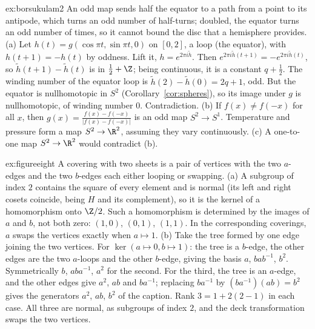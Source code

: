 \begin{solution}{ex:borsukulam2}
\idea An odd map sends half the equator to a path from a point to its antipode, which turns an odd number of half-turns; doubled, the equator turns an odd number of times, so it cannot
bound the disc that a hemisphere provides.
\writeup (a) Let $h(t)=g(\cos\pi t,\sin\pi t,0)$ on $[0,2]$, a loop (the equator), with $h(t+1)=-h(t)$ by oddness. Lift it, $h=e^{2\pi i\tilde h}$. Then $e^{2\pi i\tilde h(t+1)}=-e^{2\pi i\tilde h(t)}$, so
$\tilde h(t+1)-\tilde h(t)$ is in $\frac12+\Z$; being continuous, it is a constant $q+\frac12$. The winding number of the equator loop is $\tilde h(2)-\tilde h(0)=2q+1$, odd. But the equator is
nullhomotopic in $S^2$ (Corollary~\ref{cor:spheres}), so its image under $g$ is nullhomotopic, of winding number $0$. Contradiction. (b) If $f(x)\ne f(-x)$ for all $x$, then
$g(x)=\frac{f(x)-f(-x)}{|f(x)-f(-x)|}$ is an odd map $S^2\to S^1$. Temperature and pressure form a map $S^2\to\R^2$, assuming they vary continuously. (c) A one-to-one map $S^2\to\R^2$
would contradict (b).
\end{solution}

\begin{solution}{ex:figureeight}
\idea A covering with two sheets is a pair of vertices with the two $a$-edges and the two $b$-edges each either looping or swapping.
\writeup (a) A subgroup of index $2$ contains the square of every element and is normal (its left and right cosets coincide, being $H$ and its complement), so it is the kernel of a homomorphism onto
$\Z/2$. Such a homomorphism is determined by the images of $a$ and $b$, not both zero: $(1,0)$, $(0,1)$, $(1,1)$. In the corresponding coverings, $a$ swaps the vertices exactly when $a\mapsto1$.
(b) Take the tree formed by one edge joining the two vertices. For $\ker(a\mapsto0,b\mapsto1)$: the tree is a $b$-edge, the other edges are the two $a$-loops and the other $b$-edge, giving the basis
$a$, $bab^{-1}$, $b^2$. Symmetrically $b$, $aba^{-1}$, $a^2$ for the second. For the third, the tree is an $a$-edge, and the other edges give $a^2$, $ab$ and $ba^{-1}$; replacing $ba^{-1}$ by $(ba^{-1})(ab)=b^2$ gives the generators $a^2$, $ab$, $b^2$ of the caption.
Rank $3=1+2(2-1)$ in each case. All three are normal, as subgroups of index $2$, and the deck transformation swaps the two vertices.
\end{solution}

